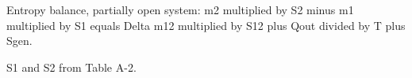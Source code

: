 Entropy balance, partially open system:  
m2 multiplied by S2 minus m1 multiplied by S1 equals Delta m12 multiplied by S12 plus Qout divided by T plus Sgen.  

S1 and S2 from Table A-2.